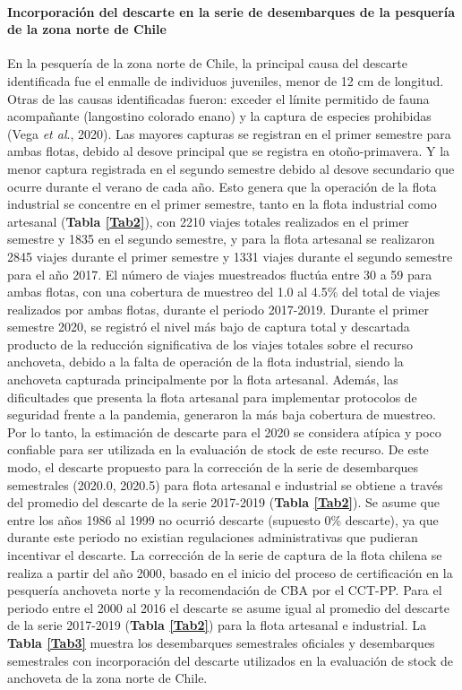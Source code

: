 \documentclass[letter,11pt]{article}
\begin{document}
\paragraph{Incorporaci\'on del descarte en la serie de desembarques de la pesquer\'ia de la zona norte de Chile}

\quad

En la pesquer\'ia de la zona norte de Chile, la principal causa del
descarte identificada fue el enmalle de individuos juveniles, menor de
12 cm de longitud. Otras de las causas identificadas fueron: exceder el
l\'imite permitido de fauna acompa\~{n}ante (langostino colorado enano) y la
captura de especies prohibidas (Vega \textit{et al}., 2020). Las mayores
capturas se registran en el primer semestre para ambas flotas, debido al
desove principal que se registra en oto\~{n}o-primavera. Y la menor captura
registrada en el segundo semestre debido al desove secundario que ocurre
durante el verano de cada a\~{n}o. Esto genera que la operaci\'on de la flota
industrial se concentre en el primer semestre, tanto en la flota
industrial como artesanal (\textbf{Tabla \ref{Tab2}}), con 2210 viajes
totales realizados en el primer semestre y 1835 en el segundo semestre,
y para la flota artesanal se realizaron 2845 viajes durante el primer
semestre y 1331 viajes durante el segundo semestre para el a\~{n}o 2017. El
n\'umero de viajes muestreados fluct\'ua entre 30 a 59 para ambas flotas,
con una cobertura de muestreo del 1.0 al 4.5\% del total de viajes
realizados por ambas flotas, durante el periodo 2017-2019. Durante el
primer semestre 2020, se registr\'o el nivel m\'as bajo de captura total y
descartada producto de la reducci\'on significativa de los viajes totales
sobre el recurso anchoveta, debido a la falta de operaci\'on de la flota
industrial, siendo la anchoveta capturada principalmente por la flota
artesanal. Adem\'as, las dificultades que presenta la flota artesanal para
implementar protocolos de seguridad frente a la pandemia, generaron la
m\'as baja cobertura de muestreo. Por lo tanto, la estimaci\'on de descarte
para el 2020 se considera at\'ipica y poco confiable para ser utilizada en
la evaluaci\'on de stock de este recurso. De este modo, el descarte
propuesto para la correcci\'on de la serie de desembarques semestrales
(2020.0, 2020.5) para flota artesanal e industrial se obtiene a trav\'es
del promedio del descarte de la serie 2017-2019
(\textbf{Tabla \ref{Tab2}}). Se asume que entre los a\~{n}os 1986 al 1999 no
ocurri\'o descarte (supuesto 0\% descarte), ya que durante este periodo no
existian regulaciones administrativas que pudieran incentivar el
descarte. La correcci\'on de la serie de captura de la flota chilena se
realiza a partir del a\~{n}o 2000, basado en el inicio del proceso de
certificaci\'on en la pesquer\'ia anchoveta norte y la recomendaci\'on de CBA
por el CCT-PP. Para el periodo entre el 2000 al 2016 el descarte se
asume igual al promedio del descarte de la serie 2017-2019
(\textbf{Tabla \ref{Tab2}}) para la flota artesanal e industrial. La
\textbf{Tabla \ref{Tab3}} muestra los desembarques semestrales oficiales
y desembarques semestrales con incorporaci\'on del descarte utilizados en
la evaluaci\'on de stock de anchoveta de la zona norte de Chile.
\end{document}

